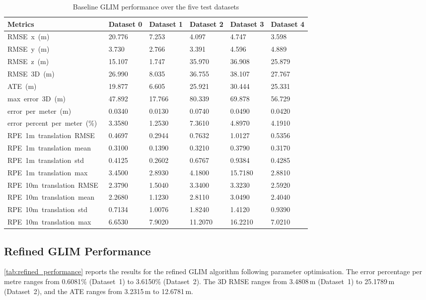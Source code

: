 \begin{table}[htbp]
\centering
\caption{Baseline GLIM performance over the five test datasets}
\label{tab:baseline_performance}
\begin{tabularx}{\textwidth}{lXXXXX}
\toprule
\textbf{Metrics} & \textbf{Dataset 0} & \textbf{Dataset 1} & \textbf{Dataset 2} & \textbf{Dataset 3} & \textbf{Dataset 4} \\ \midrule
RMSE\ x\ (m)\ & 20.776 & 7.253 & 4.097 & 4.747 & 3.598 \\
RMSE\ y\ (m)\ & 3.730 & 2.766 & 3.391 & 4.596 & 4.889 \\
RMSE\ z\ (m)\ & 15.107 & 1.747 & 35.970 & 36.908 & 25.879 \\
RMSE\ 3D\ (m)\ & 26.990 & 8.035 & 36.755 & 38.107 & 27.767 \\
ATE\ (m)\ & 19.877 & 6.605 & 25.921 & 30.444 & 25.331 \\
max\ error\ 3D\ (m)\ & 47.892 & 17.766 & 80.339 & 69.878 & 56.729 \\
error\ per\ meter\ (m)\ & 0.0340 & 0.0130 & 0.0740 & 0.0490 & 0.0420 \\
error\ percent\ per\ meter\ (\%)\ & 3.3580 & 1.2530 & 7.3610 & 4.8970 & 4.1910 \\
RPE\ 1m\ translation\ RMSE\ & 0.4697 & 0.2944 & 0.7632 & 1.0127 & 0.5356 \\
RPE\ 1m\ translation\ mean\ & 0.3100 & 0.1390 & 0.3210 & 0.3790 & 0.3170 \\
RPE\ 1m\ translation\ std\ & 0.4125 & 0.2602 & 0.6767 & 0.9384 & 0.4285 \\
RPE\ 1m\ translation\ max\ & 3.4500 & 2.8930 & 4.1800 & 15.7180 & 2.8810 \\
RPE\ 10m\ translation\ RMSE\ & 2.3790 & 1.5040 & 3.3400 & 3.3230 & 2.5920 \\
RPE\ 10m\ translation\ mean\ & 2.2680 & 1.1230 & 2.8110 & 3.0490 & 2.4040 \\
RPE\ 10m\ translation\ std\ & 0.7134 & 1.0076 & 1.8240 & 1.4120 & 0.9390 \\
RPE\ 10m\ translation\ max\ & 6.6530 & 7.9020 & 11.2070 & 16.2210 & 7.0210 \\ \bottomrule
\end{tabularx}
\end{table}

\subsection{Refined GLIM Performance}

\cref{tab:refined_performance} reports the results for the refined GLIM algorithm following parameter optimisation. The error percentage per metre ranges from 0.6081\% (Dataset~1) to 3.6150\% (Dataset~2). The 3D RMSE ranges from 3.4808\,m (Dataset~1) to 25.1789\,m (Dataset~2), and the ATE ranges from 3.2315\,m to 12.6781\,m.

